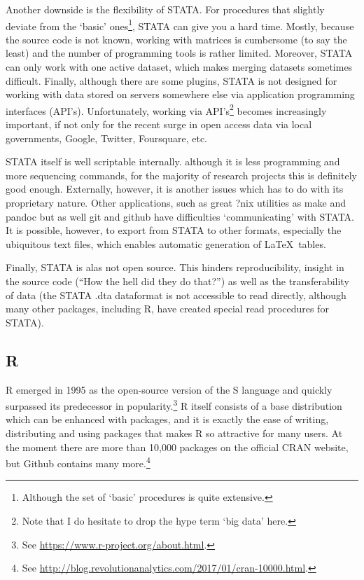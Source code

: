 \documentclass[fleqn,10pt]{SelfArx} %
\begin{document}
Another downside is the flexibility of STATA. For procedures that slightly deviate from the `basic' ones\footnote{Although the set of `basic' procedures is quite extensive.}, STATA can give you a hard time. Mostly, because the source code is not known, working with matrices is cumbersome (to say the least) and the number of programming tools is rather limited. Moreover, STATA can only work with one active dataset, which makes merging datasets sometimes difficult. Finally, although there are some plugins, STATA is not designed for working with data stored on servers somewhere else via application programming interfaces (API's). Unfortunately, working via API's\footnote{Note that I do hesitate to drop the hype term `big data' here.} becomes increasingly important, if not only for the recent surge in open access data via local governments, Google, Twitter, Foursquare, etc.

STATA itself is well scriptable internally. although it is less programming and more sequencing commands, for the majority of research projects this is definitely good enough. Externally, however, it is another issues which has to do with its proprietary nature. Other applications, such as great ?nix utilities as make and pandoc but as well git and github have difficulties `communicating' with STATA. It is possible, however, to export from STATA to other formats, especially the ubiquitous text files, which enables automatic generation of \LaTeX\ tables.

Finally, STATA is alas not open source. This hinders reproducibility, insight in the source code (``How the hell did they do that?'') as well as the transferability of data (the STATA .dta dataformat is not accessible to read directly, although many other packages, including R, have created special read procedures for STATA).

\subsection*{R}

R emerged in 1995 as the open-source version of the S language and quickly surpassed its predecessor in popularity.\footnote{See \href{https://www.r-project.org/about.html}{https://www.r-project.org/about.html}.} R itself consists of a base distribution which can be enhanced with packages, and it is exactly the ease of writing, distributing and using packages that makes R so attractive for many users. At the moment there are more than 10,000 packages on the official CRAN website, but Github contains many more.\footnote{See \href{http://blog.revolutionanalytics.com/2017/01/cran-10000.html}{http://blog.revolutionanalytics.com/2017/01/cran-10000.html}.}
\end{document}
